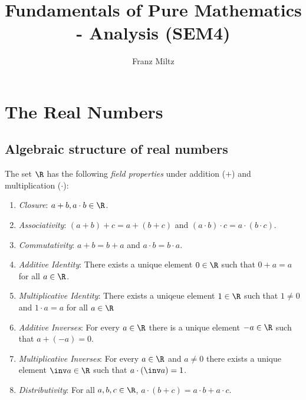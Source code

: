\documentclass{article}
\begin{document}
\mkfpmthms
\title{Fundamentals of Pure Mathematics - Analysis (SEM4)}
\author{Franz Miltz}
\maketitle
\tableofcontents
\pagebreak

\section{The Real Numbers}


\subsection{Algebraic structure of real numbers}

\begin{definition*}
    The set $\R$ has the following \emph{field properties}
    under addition ($+$) and multiplication ($\cdot$):
    \begin{enumerate}[label=F\arabic*]
        \item \emph{Closure}: $a+b, a\cdot b\in\R$.
        \item \emph{Associativity}: $(a+b)+c=a+(b+c)$ and $(a\cdot b)\cdot c=a\cdot(b\cdot c)$.
        \item \emph{Commutativity}: $a+b=b+a$ and $a\cdot b=b\cdot a$.
        \item \emph{Additive Identity}: There exists a unique element $0\in\R$ such that $0+a=a$ for all $a\in\R$.
        \item \emph{Multiplicative Identity}: There exists a uniqeue element 
              $1\in\R$ such that $1\not=0$ and $1\cdot a=a$ for all $a\in\R$
        \item \emph{Additive Inverses}: For every $a\in\R$ there is a unique
              element $-a\in\R$ such that $a+(-a)=0$.
        \item \emph{Multiplicative Inverses}: For every $a\in\R$ and $a\not=0$ there exists a unique 
              element $\inv a\in\R$ such that $a\cdot(\inv a) = 1$.
        \item \emph{Distributivity}: For all $a,b,c\in\R$, $a\cdot(b+c)=a\cdot b +a\cdot c$.
    \end{enumerate}
\end{definition*}
\end{document}
